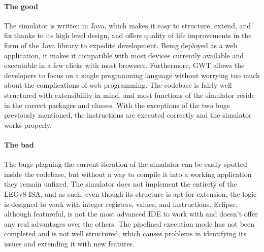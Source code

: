 \paragraph{The good}
The simulator is written in Java, which makes it easy to structure, extend, and fix thanks to its high level design, and offers quality of life improvements in the form of the Java library to expedite development. Being deployed as a web application, it makes it compatible with most devices currently available and executable in a few clicks with most browsers. Furthermore, GWT allows the developers to focus on a single programming language without worrying too much about the complications of web programming. The codebase is fairly well structured with extensibility in mind, and most functions of the simulator reside in the correct packages and classes. With the exceptions of the two bugs previously mentioned, the instructions are executed correctly and the simulator works properly.
\paragraph{The bad}
The bugs plaguing the current iteration of the simulator can be easily spotted inside the codebase, but without a way to compile it into a working application they remain unfixed. The simulator does not implement the entirety of the LEGv8 ISA, and as such, even though its structure is apt for extension, the logic is designed to work with integer registers, values, and instructions. Eclipse, although featureful, is not the most advanced IDE to work with and doesn't offer any real advantages over the others. The pipelined execution mode has not been completed and is not well structured, which causes problems in identifying its issues and extending it with new features. 
